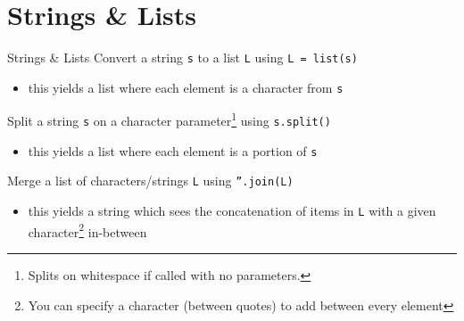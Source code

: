 \documentclass[t,handout,9pt]{beamer}
\begin{document}
\section{Strings \& Lists}
\begin{frame}{Strings \& Lists}
\vfill
Convert a string \texttt{s} to a list \texttt{L} using \texttt{L = list(s)}
\begin{itemize}
	\item this yields a list where each element is a character from \texttt{s}
\end{itemize}
Split a string \texttt{s} on a character parameter\footnote{Splits on whitespace if called with no parameters.} using \texttt{s.split()}
\begin{itemize}
	\item this yields a list where each element is a portion of \texttt{s}
\end{itemize}
Merge a list of characters/strings \texttt{L} using \texttt{''.join(L)}
\begin{itemize}
	\item this yields a string which sees the concatenation of items in \texttt{L} with a given character\footnote{You can specify a character (between quotes) to add between every element} in-between
\end{itemize}
\vfill
\end{frame}
%
\end{document}
